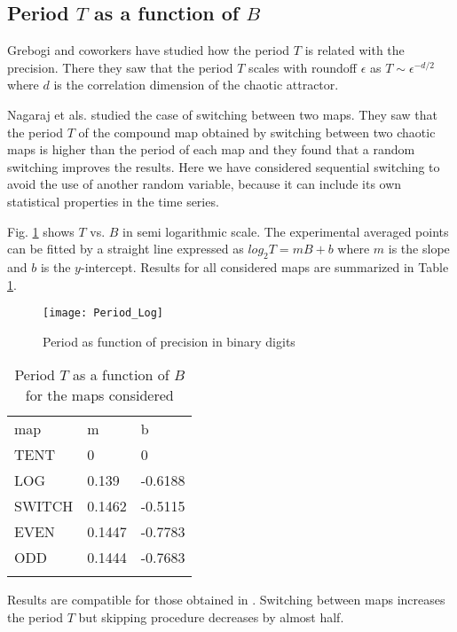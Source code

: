 \subsection{Period $T$ as a function of $B$}

Grebogi and coworkers \cite{Grebogi1988} have studied how the period $T$ is related with the precision.
There they saw that the period $T$ scales with roundoff $\epsilon$ as $T\sim\epsilon^{-d/2}$ where $d$ is the correlation dimension of the chaotic attractor.

Nagaraj et als. \cite{Nagaraj2008} studied the case of switching between two maps.
They saw that the period $T$ of the compound map obtained by switching between two chaotic maps is higher than the period of each map and they found that a random switching improves the results.
Here we have considered sequential switching to avoid the use of another random variable, because it can include its own statistical properties in the time series.

Fig. \ref{fig:period} shows  $T$ vs. $B$ in semi logarithmic scale.
The experimental averaged points can be fitted by a straight line expressed as $log_{2}T=m B + b$ where $m$ is the slope and $b$ is the $y$-intercept.
Results for all considered maps are summarized in Table \ref{tabla:periodos}.

\begin{figure}[htpb]
\centering	
	\texttt{[image: Period\_Log]}
	\caption{Period as function of precision in binary digits} \label{fig:period}
\end{figure}

\begin{table}
\centering	
	\caption{Period $T$ as a function of $B$ for the maps considered}
	\vspace{1em}
	\begin{tabular}{lll}
		\hline\noalign{\smallskip}
		map & m & b  \\
		\noalign{\smallskip}\hline\noalign{\smallskip}
		TENT&0 & 0 \\
		LOG &0.139 & -0.6188 \\
		SWITCH &0.1462 & -0.5115 \\
		EVEN &0.1447 & -0.7783 \\
		ODD &0.1444 & -0.7683 \\
		\noalign{\smallskip}\hline
	\end{tabular}
	\label{tabla:periodos}	
\end{table}

Results are compatible for those obtained in \cite{Nagaraj2008}.
Switching between maps increases the period $T$ but skipping procedure decreases by almost half.